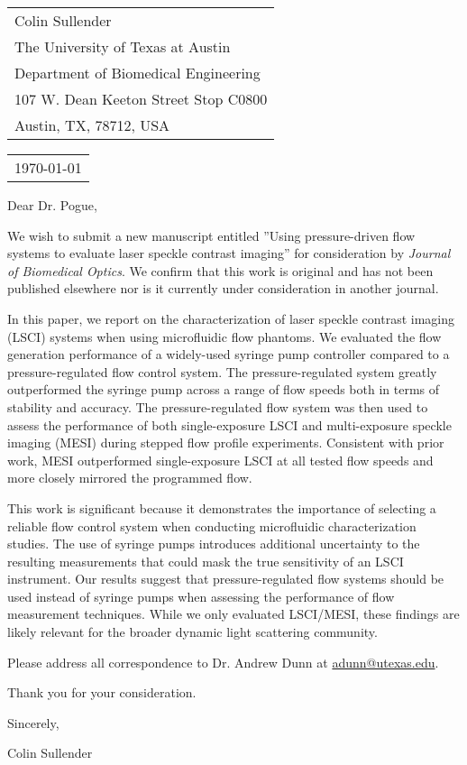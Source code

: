 \documentclass{article}
\begin{document}
\hfill
\begin{tabular}{ l @{} }
    Colin Sullender\\
    The University of Texas at Austin\\
    Department of Biomedical Engineering\\
    107 W. Dean Keeton Street Stop C0800\\
    Austin, TX, 78712, USA
\end{tabular}

\bigskip\bigskip

\begin{tabular}{ @{} l }
    \today \\[12pt] %
\end{tabular}
  
\bigskip

Dear Dr. Pogue,

\bigskip

We wish to submit a new manuscript entitled ''Using pressure-driven flow systems to evaluate laser speckle contrast imaging'' for consideration by \emph{Journal of Biomedical Optics}. We confirm that this work is original and has not been published elsewhere nor is it currently under consideration in another journal.

In this paper, we report on the characterization of laser speckle contrast imaging (LSCI) systems when using microfluidic flow phantoms. We evaluated the flow generation performance of a widely-used syringe pump controller compared to a pressure-regulated flow control system. The pressure-regulated system greatly outperformed the syringe pump across a range of flow speeds both in terms of stability and accuracy. The pressure-regulated flow system was then used to assess the performance of both single-exposure LSCI and multi-exposure speckle imaging (MESI) during stepped flow profile experiments. Consistent with prior work, MESI outperformed single-exposure LSCI at all tested flow speeds and more closely mirrored the programmed flow.

This work is significant because it demonstrates the importance of selecting a reliable flow control system when conducting microfluidic characterization studies. The use of syringe pumps introduces additional uncertainty to the resulting measurements that could mask the true sensitivity of an LSCI instrument. Our results suggest that pressure-regulated flow systems should be used instead of syringe pumps when assessing the performance of flow measurement techniques. While we only evaluated LSCI/MESI, these findings are likely relevant for the broader dynamic light scattering community.

Please address all correspondence to Dr. Andrew Dunn at \underline{adunn@utexas.edu}.

Thank you for your consideration.

\bigskip

Sincerely,

\vspace{50pt}

Colin Sullender
\end{document}
